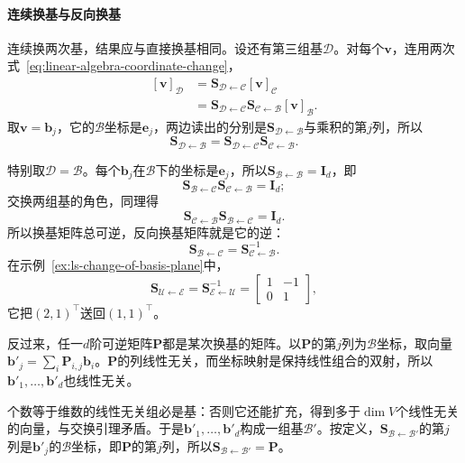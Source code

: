 \paragraph{连续换基与反向换基}
连续换两次基，结果应与直接换基相同。设还有第三组基$\mathcal D$。对每个$\bm v$，连用两次式~\eqref{eq:linear-algebra-coordinate-change}，
\[
 \begin{aligned}
 [\bm v]_{\mathcal D}&=\bm S_{\mathcal D\leftarrow\mathcal C}[\bm v]_{\mathcal C}\\
 &=\bm S_{\mathcal D\leftarrow\mathcal C}\bm S_{\mathcal C\leftarrow\mathcal B}[\bm v]_{\mathcal B}.
 \end{aligned}
\]
取$\bm v=\bm b_j$，它的$\mathcal B$坐标是$\bm e_j$，两边读出的分别是$\bm S_{\mathcal D\leftarrow\mathcal B}$与乘积的第$j$列，所以
\[
 \bm S_{\mathcal D\leftarrow\mathcal B}
 =\bm S_{\mathcal D\leftarrow\mathcal C}\bm S_{\mathcal C\leftarrow\mathcal B}.
\]

特别取$\mathcal D=\mathcal B$。每个$\bm b_j$在$\mathcal B$下的坐标是$\bm e_j$，所以$\bm S_{\mathcal B\leftarrow\mathcal B}=\bm I_d$，即
\[
 \bm S_{\mathcal B\leftarrow\mathcal C}\bm S_{\mathcal C\leftarrow\mathcal B}=\bm I_d ;
\]
交换两组基的角色，同理得
\[
 \bm S_{\mathcal C\leftarrow\mathcal B}\bm S_{\mathcal B\leftarrow\mathcal C}=\bm I_d .
\]
所以换基矩阵总可逆，反向换基矩阵就是它的逆：
\[
 \bm S_{\mathcal B\leftarrow\mathcal C}=\bm S_{\mathcal C\leftarrow\mathcal B}^{-1}.
\]
在示例~\ref{ex:ls-change-of-basis-plane}中，
\[
 \bm S_{\mathcal U\leftarrow\mathcal E}=\bm S_{\mathcal E\leftarrow\mathcal U}^{-1}=\begin{bmatrix}1&-1\\0&1\end{bmatrix},
\]
它把$(2,1)^{\top}$送回$(1,1)^{\top}$。

反过来，任一$d$阶可逆矩阵$\bm P$都是某次换基的矩阵。以$\bm P$的第$j$列为$\mathcal B$坐标，取向量$\bm b'_j=\sum_i\bm P_{i,j}\bm b_i$。$\bm P$的列线性无关，而坐标映射是保持线性组合的双射，所以$\bm b'_1,\ldots,\bm b'_d$也线性无关。

个数等于维数的线性无关组必是基：否则它还能扩充，得到多于$\dim V$个线性无关的向量，与交换引理矛盾。于是$\bm b'_1,\ldots,\bm b'_d$构成一组基$\mathcal B'$。按定义，$\bm S_{\mathcal B\leftarrow\mathcal B'}$的第$j$列是$\bm b'_j$的$\mathcal B$坐标，即$\bm P$的第$j$列，所以$\bm S_{\mathcal B\leftarrow\mathcal B'}=\bm P$。

